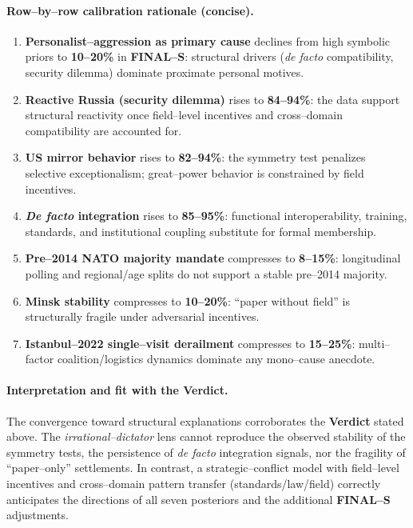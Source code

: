 \documentclass[11pt,a4paper]{article}
\begin{document}
\paragraph{Row–by–row calibration rationale (concise).}
\begin{enumerate}[label=(\arabic*)]
    \item \textbf{Personalist–aggression as primary cause} declines from high symbolic priors to \textbf{10–20\%} in \textbf{FINAL–S}: structural drivers (\emph{de facto} compatibility, security dilemma) dominate proximate personal motives.
    \item \textbf{Reactive Russia (security dilemma)} rises to \textbf{84–94\%}: the data support structural reactivity once field–level incentives and cross–domain compatibility are accounted for.
    \item \textbf{US mirror behavior} rises to \textbf{82–94\%}: the symmetry test penalizes selective exceptionalism; great–power behavior is constrained by field incentives.
    \item \textbf{\emph{De facto} integration} rises to \textbf{85–95\%}: functional interoperability, training, standards, and institutional coupling substitute for formal membership.
    \item \textbf{Pre–2014 NATO majority mandate} compresses to \textbf{8–15\%}: longitudinal polling and regional/age splits do not support a stable pre–2014 majority.
    \item \textbf{Minsk stability} compresses to \textbf{10–20\%}: “paper without field” is structurally fragile under adversarial incentives.
    \item \textbf{Istanbul–2022 single–visit derailment} compresses to \textbf{15–25\%}: multi–factor coalition/logistics dynamics dominate any mono–cause anecdote.
\end{enumerate}

\paragraph{Interpretation and fit with the Verdict.}
The convergence toward structural explanations corroborates the \textbf{Verdict} stated above. The \emph{irrational–dictator} lens cannot reproduce the observed stability of the symmetry tests, the persistence of \emph{de facto} integration signals, nor the fragility of “paper–only” settlements. In contrast, a strategic–conflict model with field–level incentives and cross–domain pattern transfer (standards/law/field) correctly anticipates the directions of all seven posteriors and the additional \textbf{FINAL–S} adjustments.
\end{document}
